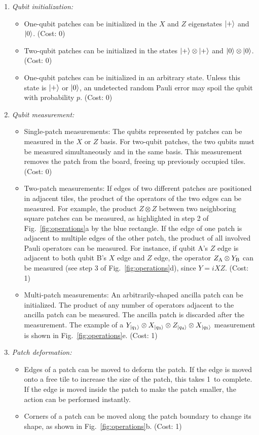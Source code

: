 \documentclass[prx,aps,letterpaper,twocolumn,allowfontchageintitle=true,accepted=2019-02-01]{quantumarticle}
\begin{document}
\begin{enumerate}
 \item[\textit{I.}] \textit{Qubit initialization:}
 \begin{itemize}
 	\item[--] One-qubit patches can be initialized in the $X$ and $Z$ eigenstates $\ket{+}$ and $\ket{0}$. (Cost: 0\clock)
 	\item[--] Two-qubit patches can be initialized in the states $\ket{+} \otimes \ket{+}$ and $\ket{0} \otimes \ket{0}$. (Cost: 0\clock)
 	\item[--] One-qubit patches can be initialized in an arbitrary state. Unless  this state is $\ket{+}$ or $\ket{0}$, an undetected random Pauli error may spoil the qubit with probability $p$. (Cost: 0\clock)
 \end{itemize}
  \item[\textit{II.}] \textit{Qubit measurement:}
 \begin{itemize}
 	\item[--] Single-patch measurements: The qubits represented by patches can be measured in the $X$ or $Z$ basis. For two-qubit patches, the two qubits must be measured simultaneously and in the same basis. This measurement removes the patch from the board, freeing up previously occupied tiles. (Cost: 0\clock)
 	\item[--] Two-patch measurements: If edges of two different patches are positioned in adjacent tiles, the product of the operators of the two edges can be measured. For example, the product $Z \otimes Z$ between two neighboring square patches can be measured, as highlighted in step 2 of Fig.~\ref{fig:operations}a by the blue rectangle. If the edge of one patch is adjacent to multiple edges of the other patch, the product of all involved Pauli operators can be measured. For instance, if qubit A's $Z$ edge is adjacent to both qubit B's $X$ edge and $Z$ edge, the operator $Z_{\rm A} \otimes Y_{\rm B}$ can be measured (see step 3 of Fig.~\ref{fig:operations}d), since $Y=iXZ$. (Cost: 1\clock)
 	\item[--] Multi-patch measurements: An arbitrarily-shaped ancilla patch can be initialized. The product of any number of operators adjacent to the ancilla patch can be measured. The ancilla patch is discarded after the measurement. The example of a $Y_{\ket{q_1}}\otimes X_{\ket{q_3}} \otimes Z_{\ket{q_4}} \otimes X_{\ket{q_5}}$ measurement is shown in Fig.~\ref{fig:operations}e. (Cost: 1\clock)
 \end{itemize}
\pagebreak
  \item[\textit{III.}] \textit{Patch deformation:}
 \begin{itemize}
 	\item[--] Edges of a patch can be moved to deform the patch. If the edge is moved onto a free tile to increase the size of the patch, this takes 1\clock ~to complete. If the edge is moved inside the patch to make the patch smaller, the action can be performed instantly.
 	\item[--] Corners of a patch can be moved along the patch boundary to change its shape, as shown in Fig.~\ref{fig:operations}b. (Cost: 1\clock)
 \end{itemize}
\end{enumerate}
\end{document}
